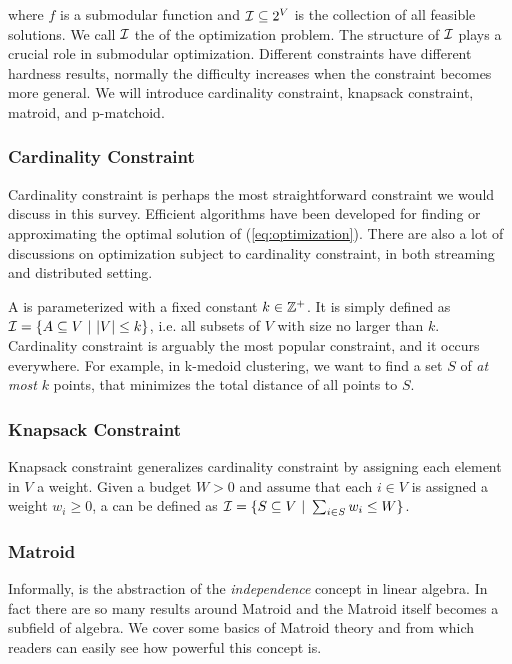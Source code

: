 where $f$ is a submodular function and $\mathcal{I} \subseteq 2^V$ is the collection of all feasible solutions. We call $\mathcal{I}$ the  of the optimization problem. The structure of $\mathcal{I}$ plays a crucial role in submodular optimization. Different constraints have different hardness results, normally the difficulty increases when the constraint becomes more general. We will introduce cardinality constraint, knapsack constraint, matroid, and p-matchoid.

\subsubsection{Cardinality Constraint}
Cardinality constraint is perhaps the most straightforward constraint we would discuss in this survey. Efficient algorithms have been developed for finding or approximating the optimal solution of (\ref{eq:optimization}). There are also a lot of discussions on optimization subject to cardinality constraint, in both streaming and distributed setting. 

A  is parameterized with a fixed constant $k \in \mathbb{Z}^+$. It is simply defined as $\mathcal{I} = \{A \subseteq V ~|~ |V| \leq k\}$, i.e. all subsets of $V$ with size no larger than $k$. Cardinality constraint is arguably the most popular constraint, and it occurs everywhere. For example, in k-medoid clustering, we want to find a set $S$ of \emph{at most} $k$ points, that minimizes the total distance of all points to $S$.  

\subsubsection{Knapsack Constraint}
Knapsack constraint generalizes cardinality constraint by assigning each element in $V$ a weight. Given a budget $W > 0$ and assume that each $i \in V$ is assigned a weight $w_i \geq 0$, a  can be defined as $\mathcal{I} = \{S \subseteq V ~|~ \sum_{i\in S} w_i \leq W \}$.


\subsubsection{Matroid}
Informally,   is the abstraction of the \emph{independence} concept in linear algebra. In fact there are so many results around Matroid and the Matroid itself becomes a subfield of algebra. We cover some basics of Matroid theory and from which readers can easily see how powerful this concept is. 

